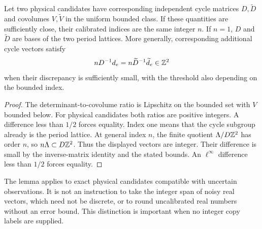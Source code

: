 \begin{lemma}\label{lem:integer-lock}
Let two physical candidates have corresponding independent cycle matrices
$D,\widetilde D$ and covolumes $V,\widetilde V$ in the uniform bounded
class. If these quantities are sufficiently close, their calibrated
indices are the same integer $n$. If $n=1$, $D$ and $\widetilde D$
are bases of the two period lattices. More generally, corresponding
additional cycle vectors satisfy
\[
          nD^{-1}d_e=n\widetilde D^{-1}\widetilde d_e\in\mathbb Z^2
\]
when their discrepancy is sufficiently small, with the threshold also
depending on the bounded index.
\end{lemma}
\begin{proof}
The determinant-to-covolume ratio is Lipschitz on the bounded set with
$V$ bounded below. For physical candidates both ratios are positive
integers. A difference less than $1/2$ forces equality. Index one means
that the cycle subgroup already is the period lattice. At general index
$n$, the finite quotient $\Lambda/D\mathbb Z^2$ has order $n$, so
$n\Lambda\subset D\mathbb Z^2$. Thus the displayed vectors are integer.
Their difference is small by the inverse-matrix identity and the stated
bounds. An $\ell^\infty$ difference less than $1/2$ forces equality.
\end{proof}

The lemma applies to exact physical candidates compatible with uncertain
observations. It is not an instruction to take the integer span of noisy
real vectors, which need not be discrete, or to round uncalibrated real
numbers without an error bound. This distinction is important when no
integer copy labels are supplied.

